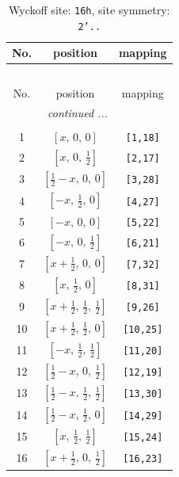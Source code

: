 \documentclass[fleqn,8pt]{jsarticle}
\begin{document}
\begin{longtable}{ccc}
\caption{Wyckoff site: {\tt 16h}, site symmetry: {\tt 2'..}}
 \\
 \hline \hline
No. & position & mapping \\ \hline \endfirsthead

\multicolumn{2}{l}{\tablename\ \thetable{}} \\
 \hline \hline
No. & position & mapping \\ \hline \endhead

 \hline \hline
\multicolumn{2}{r}{\footnotesize\it continued ...} \\ \endfoot

 \hline \hline
\multicolumn{2}{r}{} \\ \endlastfoot

1 & $\left[ x,\, 0,\, 0 \right]$ & {\tt [1,18]} \\ \hline
2 & $\left[ x,\, 0,\, \frac{1}{2} \right]$ & {\tt [2,17]} \\ \hline
3 & $\left[ \frac{1}{2} - x,\, 0,\, 0 \right]$ & {\tt [3,28]} \\ \hline
4 & $\left[ - x,\, \frac{1}{2},\, 0 \right]$ & {\tt [4,27]} \\ \hline
5 & $\left[ - x,\, 0,\, 0 \right]$ & {\tt [5,22]} \\ \hline
6 & $\left[ - x,\, 0,\, \frac{1}{2} \right]$ & {\tt [6,21]} \\ \hline
7 & $\left[ x + \frac{1}{2},\, 0,\, 0 \right]$ & {\tt [7,32]} \\ \hline
8 & $\left[ x,\, \frac{1}{2},\, 0 \right]$ & {\tt [8,31]} \\ \hline
9 & $\left[ x + \frac{1}{2},\, \frac{1}{2},\, \frac{1}{2} \right]$ & {\tt [9,26]} \\ \hline
10 & $\left[ x + \frac{1}{2},\, \frac{1}{2},\, 0 \right]$ & {\tt [10,25]} \\ \hline
11 & $\left[ - x,\, \frac{1}{2},\, \frac{1}{2} \right]$ & {\tt [11,20]} \\ \hline
12 & $\left[ \frac{1}{2} - x,\, 0,\, \frac{1}{2} \right]$ & {\tt [12,19]} \\ \hline
13 & $\left[ \frac{1}{2} - x,\, \frac{1}{2},\, \frac{1}{2} \right]$ & {\tt [13,30]} \\ \hline
14 & $\left[ \frac{1}{2} - x,\, \frac{1}{2},\, 0 \right]$ & {\tt [14,29]} \\ \hline
15 & $\left[ x,\, \frac{1}{2},\, \frac{1}{2} \right]$ & {\tt [15,24]} \\ \hline
16 & $\left[ x + \frac{1}{2},\, 0,\, \frac{1}{2} \right]$ & {\tt [16,23]} \\
\end{longtable}
\end{document}
